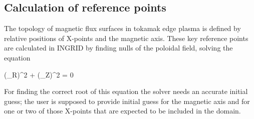 \subsection{Calculation of reference points}

The topology of magnetic flux surfaces in tokamak edge plasma is
defined by relative positions of X-points and the magnetic axis. These
key reference points are calculated in INGRID by finding nulls of the
poloidal field, solving the equation

\beq
(\Psi_R)^2 + (\Psi_Z)^2 = 0
\eeq

For finding the correct root of this equation the solver needs an
accurate initial guess; the user is supposed to provide initial guess
for the magnetic axis and for one or two of those X-points that are
expected to be included in the domain.
